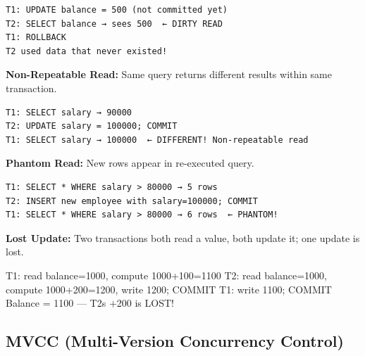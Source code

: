 \documentclass[11pt]{article}
\newenvironment{Shaded}{\begin{snugshade}}{\end{snugshade}}
\newcommand{\DecValTok}[1]{\textcolor[rgb]{0.96,0.45,0.00}{#1}}
\newcommand{\NormalTok}[1]{\textcolor[rgb]{0.81,0.81,0.76}{#1}}
\newcommand{\OperatorTok}[1]{\textcolor[rgb]{0.81,0.81,0.76}{#1}}
\newcommand{\StringTok}[1]{\textcolor[rgb]{0.96,0.31,0.31}{#1}}
\begin{document}
\setcodelang{}

\begin{verbatim}
T1: UPDATE balance = 500 (not committed yet)
T2: SELECT balance → sees 500  ← DIRTY READ
T1: ROLLBACK
T2 used data that never existed!
\end{verbatim}

\textbf{Non-Repeatable Read:} Same query returns different results within same transaction.

\setcodelang{}

\begin{verbatim}
T1: SELECT salary → 90000
T2: UPDATE salary = 100000; COMMIT
T1: SELECT salary → 100000  ← DIFFERENT! Non-repeatable read
\end{verbatim}

\textbf{Phantom Read:} New rows appear in re-executed query.

\setcodelang{}

\begin{verbatim}
T1: SELECT * WHERE salary > 80000 → 5 rows
T2: INSERT new employee with salary=100000; COMMIT
T1: SELECT * WHERE salary > 80000 → 6 rows  ← PHANTOM!
\end{verbatim}

\textbf{Lost Update:} Two transactions both read a value, both update it; one update is lost.


\begin{Shaded}
\begin{Highlighting}[]
\NormalTok{T1: read balance}\OperatorTok{=}\DecValTok{1000}\NormalTok{, compute }\DecValTok{1000}\OperatorTok{+}\DecValTok{100}\OperatorTok{=}\DecValTok{1100}
\NormalTok{T2: read balance}\OperatorTok{=}\DecValTok{1000}\NormalTok{, compute }\DecValTok{1000}\OperatorTok{+}\DecValTok{200}\OperatorTok{=}\DecValTok{1200}\NormalTok{, write }\DecValTok{1200}\OperatorTok{;}\NormalTok{ COMMIT}
\NormalTok{T1: write }\DecValTok{1100}\OperatorTok{;}\NormalTok{ COMMIT}
\NormalTok{Balance }\OperatorTok{=} \DecValTok{1100}\NormalTok{ — T2}\StringTok{\textquotesingle{}s +200 is LOST!}
\end{Highlighting}
\end{Shaded}

\subsection{MVCC (Multi-Version Concurrency Control)}\label{mvcc-multi-version-concurrency-control}
\end{document}
